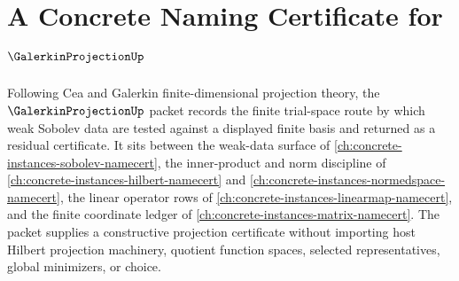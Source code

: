 \chapter{A Concrete Naming Certificate for $\GalerkinProjectionUp$}
\label{ch:concrete-instances-galerkin-projection-namecert}

Following Cea and Galerkin finite-dimensional projection theory, the $\GalerkinProjectionUp$ packet records the finite trial-space route by which weak Sobolev data are tested against a displayed finite basis and returned as a residual certificate. It sits between the weak-data surface of \autoref{ch:concrete-instances-sobolev-namecert}, the inner-product and norm discipline of \autoref{ch:concrete-instances-hilbert-namecert} and \autoref{ch:concrete-instances-normedspace-namecert}, the linear operator rows of \autoref{ch:concrete-instances-linearmap-namecert}, and the finite coordinate ledger of \autoref{ch:concrete-instances-matrix-namecert}. The packet supplies a constructive projection certificate without importing host Hilbert projection machinery, quotient function spaces, selected representatives, global minimizers, or choice.

